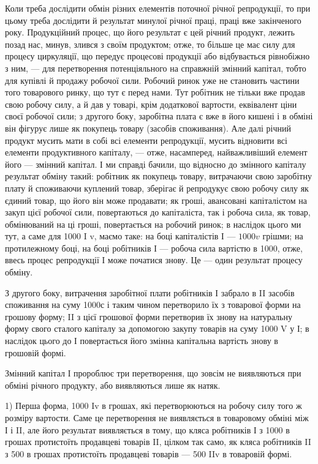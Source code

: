 Коли треба дослідити обмін різних елементів поточної річної репродукції,
то при цьому треба дослідити й результат минулої річної праці,
праці вже закінченого року. Продукційний процес, що його результат є
цей річний продукт, лежить позад нас, минув, злився з своїм продуктом;
отже, то більше це має силу для процесу циркуляції, що передує
процесові продукції або відбувається рівнобіжно з ним, — для перетворення
потенціяльного на справжній змінний капітал, тобто для купівлі
й продажу робочої сили. Робочий ринок уже не становить частини того
товарового ринку, що тут є перед нами. Тут робітник не тільки вже продав
свою робочу силу, а й дав у товарі, крім додаткової вартости,
еквівалент ціни своєї робочої сили; з другого боку, заробітна плата є
вже в його кишені і в обміні він фігурує лише як покупець товару
(засобів споживання). Але далі річний продукт мусить мати в собі всі
елементи репродукції, мусить відновити всі елементи продуктивного капіталу,
— отже, насамперед, найважливіший елемент його — змінний капітал.
І ми справді бачили, що відносно до змінного капіталу результат обміну
такий: робітник як покупець товару, витрачаючи свою заробітну плату
й споживаючи куплений товар, зберігає й репродукує свою робочу силу
як єдиний товар, що його він може продавати; як гроші, авансовані
капіталістом на закуп цієї робочої сили, повертаються до капіталіста, так
і робоча сила, як товар, обмінюваний на ці гроші, повертається на робочий
ринок; в наслідок цього ми тут, а саме для 1000 I v, маємо таке:
на боці капіталістів І — $1000v$ грішми; на протилежному боці, на
боці робітників І — робоча сила вартістю в 1000, отже, ввесь процес
репродукції І може початися знову. Це — один результат процесу
обміну.

З другого боку, витрачення заробітної плати робітників І забрало
в II засобів споживання на суму 1000с і таким чином перетворило їх з
товарової форми на грошову форму; II з цієї грошової форми перетворив
їх знову на натуральну форму свого сталого капіталу за допомогою
закупу товарів на суму 1000 V у І; в наслідок цього до І повертається
його змінна капітальна вартість знову в грошовій формі.

Змінний капітал І пророблює три перетворення, що зовсім не виявляються
при обміні річного продукту, або виявляються лише як натяк.

1) Перша форма, 1000 Iv в грошах, які перетворюються на робочу
силу того ж розміру вартости. Саме це перетворення не виявляється в
товаровому обміні між І і II, але його результат виявляється в тому, що
кляса робітників І з 1000 в грошах протистоїть продавцеві товарів II,
цілком так само, як кляса робітників II з 500 в грошах протистоїть
продавцеві товарів — 500 IIv в товаровій формі.

